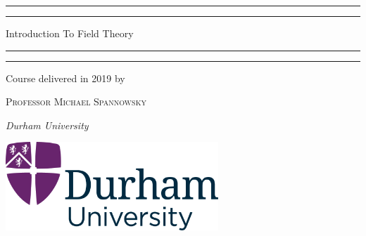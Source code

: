 \documentclass[11pt,oneside]{book}
\theoremstyle{definition} %
\theoremstyle{plain} %
\theoremstyle{remark} %
\theoremstyle{underline}
\begin{document}

\frontmatter

\begin{titlepage}
	\centering
	    \scshape %
        \vspace*{\baselineskip} %
        
	    \rule{\textwidth}{1.6pt}\vspace*{-\baselineskip}\vspace*{2pt} %
	    \rule{\textwidth}{0.4pt} %
	    
	    \vspace{0.75\baselineskip} %
	    
	    {\LARGE Introduction To Field Theory} %
	    
	    \vspace{0.75\baselineskip} %
	    
	    \rule{\textwidth}{0.4pt}\vspace*{-\baselineskip}\vspace{3.2pt} %
	    \rule{\textwidth}{1.6pt} %
	    
        \vspace{5\baselineskip} %

	    Course delivered in 2019 by 
	
	    \vspace{0.5\baselineskip} %
	
	    {\scshape\Large Professor Michael Spannowsky} %
	
	    \vspace{0.5\baselineskip} %
	
	    \textit{Durham University} %
	    
	    \vspace{5\baselineskip} %
	    
	    \includegraphics[width=8cm]{images/DurhamLogo.png}\\[1cm] %
	    

\end{titlepage}
\end{document}
